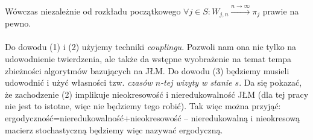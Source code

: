 \documentclass[a4paper]{article}
\begin{document}
Wówczas niezależnie od rozkładu początkowego $\forall j \in S: W_{j,n} \xrightarrow{{n \rightarrow \infty}} \pi_j$ prawie na pewno.
\\\\Do dowodu (1) i (2) użyjemy techniki \textit{couplingu}. Pozwoli nam ona nie tylko na udowodnienie twierdzenia, ale także da wstępne wyobrażenie na temat tempa zbieżności algorytmów bazujących na JŁM. Do dowodu (3) będziemy musieli udowodnić i użyć własności tzw. \textit{czasów $n$-tej wizyty w stanie $s$}. Da się pokazać, że zachodzenie (2) implikuje nieokresowość i nieredukowalność JŁM (dla tej pracy nie jest to istotne, więc nie będziemy tego robić). Tak więc można przyjąć: ergodyczność=nieredukowalność+nieokresowość – nieredukowalną i nieokresową macierz stochastyczną będziemy więc nazywać ergodyczną.
\\
\end{document}
